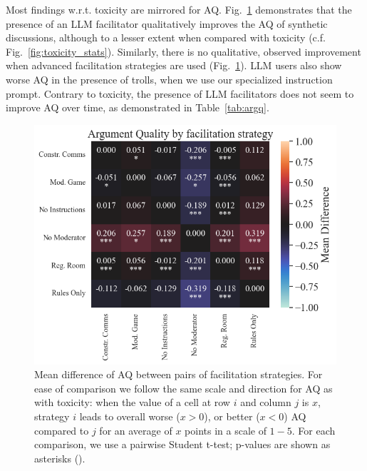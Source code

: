 Most findings w.r.t. toxicity are mirrored for \ac{AQ}. Fig.~\ref{fig:aq_stats} demonstrates that the presence of an \ac{LLM} facilitator qualitatively improves the \ac{AQ} of synthetic discussions, although to a lesser extent when compared with toxicity (c.f. Fig.~\ref{fig:toxicity_stats}). Similarly, there is no qualitative, observed improvement when advanced facilitation strategies are used (Fig.~\ref{fig:aq_stats}). \ac{LLM} users also show worse \ac{AQ} in the presence of trolls, when we use our specialized instruction prompt. Contrary to toxicity, the presence of \ac{LLM} facilitators does not seem to improve \ac{AQ} over time, as demonstrated in Table~\ref{tab:argq}.

\begin{figure}
	\includegraphics[width=\linewidth]{resources/argumentq_stats.png}
	\centering
	\caption{Mean difference of \ac{AQ} between pairs of facilitation strategies. For ease of comparison we follow the same scale and direction for \ac{AQ} as with toxicity: when the value of a cell at row $i$ and column $j$ is $x$, strategy $i$ leads to overall  worse ($x>0$), or better ($x<0$) \ac{AQ} compared to $j$ for an average of $x$ points in a scale of $1-5$. For each comparison, we use a pairwise Student t-test; p-values are shown as asterisks (\asterisknote).}
	\label{fig:aq_stats}
\end{figure}



